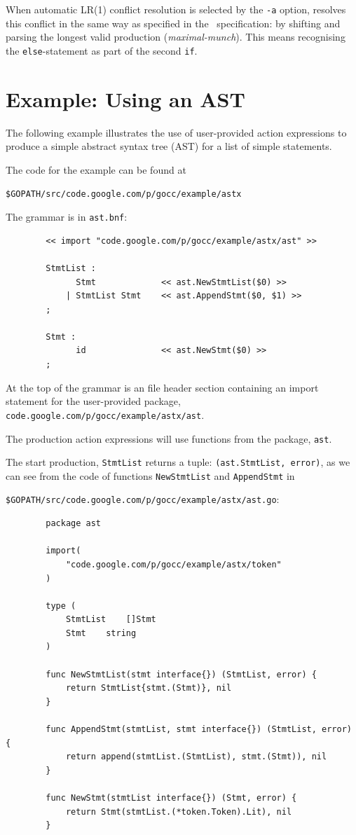 \documentclass[12pt]{article}
\begin{document}
	When automatic LR(1) conflict resolution is selected by the \verb|-a| option, \gocc resolves this conflict in the same way as specified in the \Clang\ specification: by shifting and parsing the longest valid production ({\em maximal-munch}). This means recognising the \verb|else|-statement as part of the second \verb|if|.

\section{Example: Using an AST} \label{sec:example ast}
	The following example illustrates the use of user-provided action expressions to produce a simple abstract syntax tree (AST) for a list of simple statements. 

	The code for the example can be found at

	\verb|$GOPATH/src/code.google.com/p/gocc/example/astx|

	The grammar is in \verb|ast.bnf|:

	\begin{verbatim}
		<< import "code.google.com/p/gocc/example/astx/ast" >>

		StmtList : 
		      Stmt             << ast.NewStmtList($0) >>
		    | StmtList Stmt    << ast.AppendStmt($0, $1) >>
		;

		Stmt : 
		      id               << ast.NewStmt($0) >>
		;
	\end{verbatim}

	At the top of the grammar is an file header section containing an import statement for the user-provided package, 
	\verb|code.google.com/p/gocc/example/astx/ast|.

	The production action expressions will use functions from the package, \verb|ast|.

	The start production, \verb"StmtList" returns a tuple: \verb|(ast.StmtList, error)|, as we can see from the code of functions 
	\verb|NewStmtList| and \verb|AppendStmt| in 

	\verb|$GOPATH/src/code.google.com/p/gocc/example/astx/ast.go|:

	\begin{verbatim}
		package ast

		import(
		    "code.google.com/p/gocc/example/astx/token"
		)

		type (
		    StmtList	[]Stmt
		    Stmt 	string
		)

		func NewStmtList(stmt interface{}) (StmtList, error) {
		    return StmtList{stmt.(Stmt)}, nil
		}

		func AppendStmt(stmtList, stmt interface{}) (StmtList, error) {
		    return append(stmtList.(StmtList), stmt.(Stmt)), nil
		}	

		func NewStmt(stmtList interface{}) (Stmt, error) {
		    return Stmt(stmtList.(*token.Token).Lit), nil
		}
	\end{verbatim}
\end{document}
